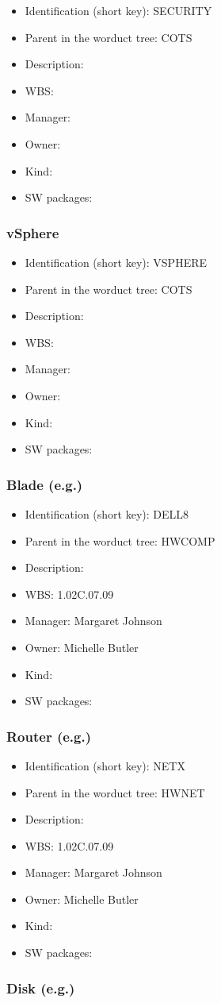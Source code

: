 \begin{itemize}\item Identification (short key): SECURITY
\item Parent in the worduct tree: COTS
\item Description: 
\item WBS: 
\item Manager: 
\item Owner: 
\item Kind:
\item SW packages: 
\end{itemize}\subsubsection{vSphere}
\begin{itemize}\item Identification (short key): VSPHERE
\item Parent in the worduct tree: COTS
\item Description: 
\item WBS: 
\item Manager: 
\item Owner: 
\item Kind:
\item SW packages: 
\end{itemize}\subsubsection{Blade (e.g.)}
\begin{itemize}\item Identification (short key): DELL8
\item Parent in the worduct tree: HWCOMP
\item Description: 
\item WBS: 1.02C.07.09
\item Manager: Margaret Johnson
\item Owner: Michelle Butler
\item Kind:
\item SW packages: 
\end{itemize}\subsubsection{Router (e.g.)}
\begin{itemize}\item Identification (short key): NETX
\item Parent in the worduct tree: HWNET
\item Description: 
\item WBS: 1.02C.07.09
\item Manager: Margaret Johnson
\item Owner: Michelle Butler
\item Kind:
\item SW packages: 
\end{itemize}\subsubsection{Disk (e.g.)}
